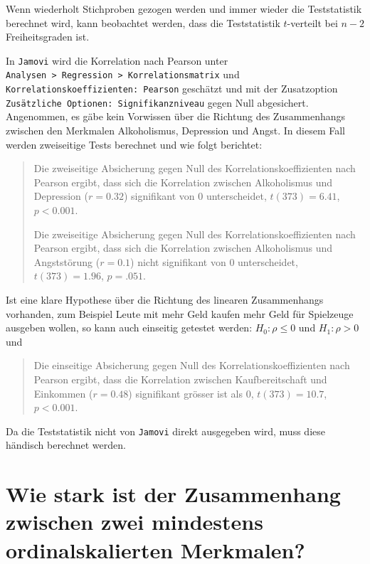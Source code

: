 \documentclass[
]{book}
\theoremstyle{definition}
\theoremstyle{definition}
\theoremstyle{definition}
\theoremstyle{definition}
\theoremstyle{remark}
\begin{document}
Wenn wiederholt Stichproben gezogen werden und immer wieder die Teststatistik berechnet wird, kann beobachtet werden, dass die Teststatistik \(t\)-verteilt bei \(n-2\) Freiheitsgraden ist.

In \texttt{Jamovi} wird die Korrelation nach Pearson unter \texttt{Analysen\ \textgreater{}\ Regression\ \textgreater{}\ Korrelationsmatrix} und \texttt{Korrelationskoeffizienten:\ Pearson} geschätzt und mit der Zusatzoption \texttt{Zusätzliche\ Optionen:\ Signifikanzniveau} gegen Null abgesichert. Angenommen, es gäbe kein Vorwissen über die Richtung des Zusammenhangs zwischen den Merkmalen Alkoholismus, Depression und Angst. In diesem Fall werden zweiseitige Tests berechnet und wie folgt berichtet:

\begin{quote}
Die zweiseitige Absicherung gegen Null des Korrelationskoeffizienten nach Pearson ergibt, dass sich die Korrelation zwischen Alkoholismus und Depression (\(r = 0.32\)) signifikant von \(0\) unterscheidet, \(t(373) = 6.41\), \(p < 0.001\).

Die zweiseitige Absicherung gegen Null des Korrelationskoeffizienten nach Pearson ergibt, dass sich die Korrelation zwischen Alkoholismus und Angststörung (\(r = 0.1\)) nicht signifikant von \(0\) unterscheidet, \(t(373) = 1.96\), \(p = .051\).
\end{quote}

Ist eine klare Hypothese über die Richtung des linearen Zusammenhangs vorhanden, zum Beispiel Leute mit mehr Geld kaufen mehr Geld für Spielzeuge ausgeben wollen, so kann auch einseitig getestet werden: \(H_0: \rho \leq 0\) und \(H_1: \rho > 0\) und

\begin{quote}
Die einseitige Absicherung gegen Null des Korrelationskoeffizienten nach Pearson ergibt, dass die Korrelation zwischen Kaufbereitschaft und Einkommen (\(r = 0.48\)) signifikant grösser ist als \(0\), \(t(373) = 10.7\), \(p < 0.001\).
\end{quote}

Da die Teststatistik nicht von \texttt{Jamovi} direkt ausgegeben wird, muss diese händisch berechnet werden.

\section{Wie stark ist der Zusammenhang zwischen zwei mindestens ordinalskalierten Merkmalen?}\label{wie-stark-ist-der-zusammenhang-zwischen-zwei-mindestens-ordinalskalierten-merkmalen}
\end{document}
